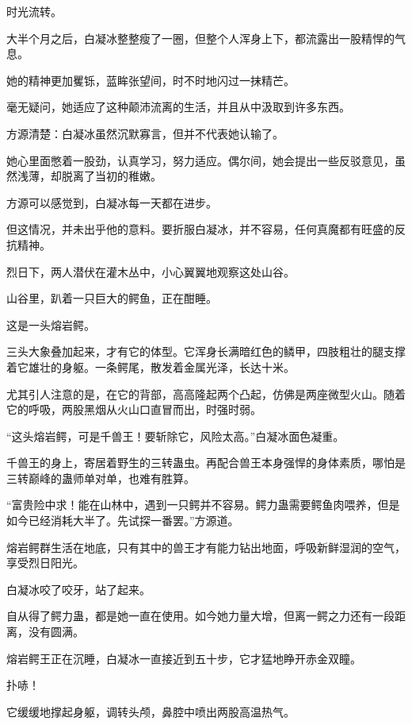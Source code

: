 
\begin{this_body}



时光流转。

大半个月之后，白凝冰整整瘦了一圈，但整个人浑身上下，都流露出一股精悍的气息。

她的精神更加矍铄，蓝眸张望间，时不时地闪过一抹精芒。

毫无疑问，她适应了这种颠沛流离的生活，并且从中汲取到许多东西。

方源清楚：白凝冰虽然沉默寡言，但并不代表她认输了。

她心里面憋着一股劲，认真学习，努力适应。偶尔间，她会提出一些反驳意见，虽然浅薄，却脱离了当初的稚嫩。

方源可以感觉到，白凝冰每一天都在进步。

但这情况，并未出乎他的意料。要折服白凝冰，并不容易，任何真魔都有旺盛的反抗精神。

烈日下，两人潜伏在灌木丛中，小心翼翼地观察这处山谷。

山谷里，趴着一只巨大的鳄鱼，正在酣睡。

这是一头熔岩鳄。

三头大象叠加起来，才有它的体型。它浑身长满暗红色的鳞甲，四肢粗壮的腿支撑着它雄壮的身躯。一条鳄尾，散发着金属光泽，长达十米。

尤其引人注意的是，在它的背部，高高隆起两个凸起，仿佛是两座微型火山。随着它的呼吸，两股黑烟从火山口直冒而出，时强时弱。

“这头熔岩鳄，可是千兽王！要斩除它，风险太高。”白凝冰面色凝重。

千兽王的身上，寄居着野生的三转蛊虫。再配合兽王本身强悍的身体素质，哪怕是三转巅峰的蛊师单对单，也难有胜算。

“富贵险中求！能在山林中，遇到一只鳄并不容易。鳄力蛊需要鳄鱼肉喂养，但是如今已经消耗大半了。先试探一番罢。”方源道。

熔岩鳄群生活在地底，只有其中的兽王才有能力钻出地面，呼吸新鲜湿润的空气，享受烈日阳光。

白凝冰咬了咬牙，站了起来。

自从得了鳄力蛊，都是她一直在使用。如今她力量大增，但离一鳄之力还有一段距离，没有圆满。

熔岩鳄王正在沉睡，白凝冰一直接近到五十步，它才猛地睁开赤金双瞳。

扑哧！

它缓缓地撑起身躯，调转头颅，鼻腔中喷出两股高温热气。


\end{this_body}
